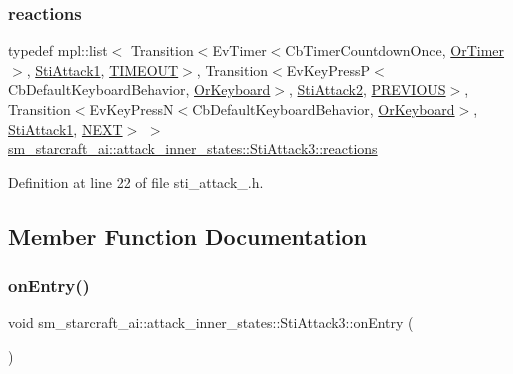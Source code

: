\subsubsection{\texorpdfstring{reactions}{reactions}}
{\footnotesize\ttfamily typedef mpl\+::list$<$ Transition$<$Ev\+Timer$<$Cb\+Timer\+Countdown\+Once, \hyperlink{classsm__starcraft__ai_1_1OrTimer}{Or\+Timer}$>$, \hyperlink{structsm__starcraft__ai_1_1attack__inner__states_1_1StiAttack1}{Sti\+Attack1}, \hyperlink{structsm__starcraft__ai_1_1attack__inner__states_1_1StiAttack3_1_1TIMEOUT}{T\+I\+M\+E\+O\+UT}$>$, Transition$<$Ev\+Key\+PressP$<$Cb\+Default\+Keyboard\+Behavior, \hyperlink{classsm__starcraft__ai_1_1OrKeyboard}{Or\+Keyboard}$>$, \hyperlink{structsm__starcraft__ai_1_1attack__inner__states_1_1StiAttack2}{Sti\+Attack2}, \hyperlink{structsm__starcraft__ai_1_1attack__inner__states_1_1StiAttack3_1_1PREVIOUS}{P\+R\+E\+V\+I\+O\+US}$>$, Transition$<$Ev\+Key\+PressN$<$Cb\+Default\+Keyboard\+Behavior, \hyperlink{classsm__starcraft__ai_1_1OrKeyboard}{Or\+Keyboard}$>$, \hyperlink{structsm__starcraft__ai_1_1attack__inner__states_1_1StiAttack1}{Sti\+Attack1}, \hyperlink{structsm__starcraft__ai_1_1attack__inner__states_1_1StiAttack3_1_1NEXT}{N\+E\+XT}$>$ $>$ \hyperlink{structsm__starcraft__ai_1_1attack__inner__states_1_1StiAttack3_acebef7eb53f0bacb5a6be79fdd61c831}{sm\+\_\+starcraft\+\_\+ai\+::attack\+\_\+inner\+\_\+states\+::\+Sti\+Attack3\+::reactions}}



Definition at line 22 of file sti\+\_\+attack\+\_.\+h.



\subsection{Member Function Documentation}
\mbox{\label{structsm__starcraft__ai_1_1attack__inner__states_1_1StiAttack3_a9550a513b642e65826a76da9d6c3df58}} 
\subsubsection{\texorpdfstring{on\+Entry()}{onEntry()}}
{\footnotesize\ttfamily void sm\+\_\+starcraft\+\_\+ai\+::attack\+\_\+inner\+\_\+states\+::\+Sti\+Attack3\+::on\+Entry (\begin{DoxyParamCaption}{ }\end{DoxyParamCaption})\hspace{0.3cm}{\ttfamily [inline]}}



